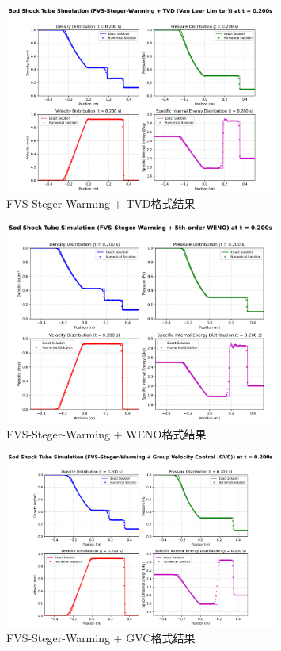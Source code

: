 \documentclass[12pt,a4paper]{article}
\begin{document}
\begin{figure}[!htbp]
    \centering
    \includegraphics[width=0.8\textwidth]{Sod_Shock_FVS-Steger-Warming + TVD (Van Leer Limiter)_t_0p200s.png}
    \caption{FVS-Steger-Warming + TVD格式结果}
\end{figure}
\begin{figure}[!htbp]
    \centering
    \includegraphics[width=0.8\textwidth]{Sod_Shock_FVS-Steger-Warming + 5th-order WENO_t_0p200s.png}
    \caption{FVS-Steger-Warming + WENO格式结果}
\end{figure}
\begin{figure}[!htbp]
    \centering
    \includegraphics[width=0.8\textwidth]{Sod_Shock_FVS-Steger-Warming + Group Velocity Control (GVC)_t_0p200s.png}
    \caption{FVS-Steger-Warming + GVC格式结果}
\end{figure}
\end{document}
